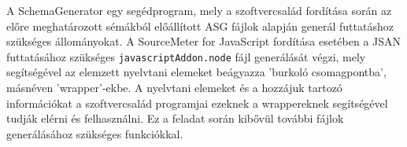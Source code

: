 A SchemaGenerator egy segédprogram, mely a szoftvercsalád fordítása során az előre meghatározott sémákból előállított ASG fájlok alapján generál futtatáshoz szükséges állományokat. A SourceMeter for JavaScript fordítása esetében a JSAN futtatásához szükséges \texttt{javascriptAddon.node} fájl generálását végzi, mely segítségével az elemzett nyelvtani elemeket beágyazza 'burkoló csomagpontba', másnéven 'wrapper'-ekbe. A nyelvtani elemeket és a hozzájuk tartozó információkat a szoftvercsalád programjai ezeknek a wrappereknek segítségével tudják elérni és felhasználni. Ez a feladat során kibővül további fájlok generálásához szükséges funkciókkal.


